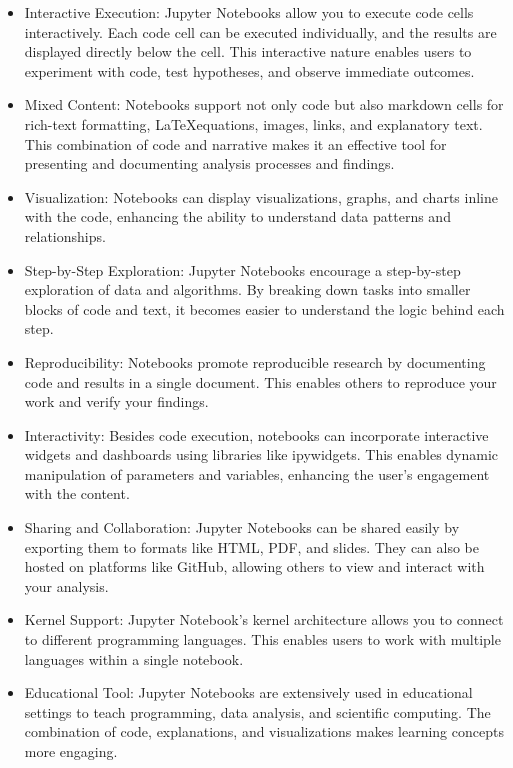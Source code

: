 \begin{itemize}
    \item Interactive Execution: Jupyter Notebooks allow you to execute code cells interactively. Each code cell can be executed individually, and the results are displayed directly below the cell. This interactive nature enables users to experiment with code, test hypotheses, and observe immediate outcomes.
    
    \item Mixed Content: Notebooks support not only code but also markdown cells for rich-text formatting, \LaTeX equations, images, links, and explanatory text. This combination of code and narrative makes it an effective tool for presenting and documenting analysis processes and findings.
    
    \item Visualization: Notebooks can display visualizations, graphs, and charts inline with the code, enhancing the ability to understand data patterns and relationships.
    
    \item Step-by-Step Exploration: Jupyter Notebooks encourage a step-by-step exploration of data and algorithms. By breaking down tasks into smaller blocks of code and text, it becomes easier to understand the logic behind each step.
    
    \item Reproducibility: Notebooks promote reproducible research by documenting code and results in a single document. This enables others to reproduce your work and verify your findings.
    
    \item Interactivity: Besides code execution, notebooks can incorporate interactive widgets and dashboards using libraries like ipywidgets. This enables dynamic manipulation of parameters and variables, enhancing the user's engagement with the content.
    
    \item Sharing and Collaboration: Jupyter Notebooks can be shared easily by exporting them to formats like HTML, PDF, and slides. They can also be hosted on platforms like GitHub, allowing others to view and interact with your analysis.
    
    \item Kernel Support: Jupyter Notebook's kernel architecture allows you to connect to different programming languages. This enables users to work with multiple languages within a single notebook.
    
    \item Educational Tool: Jupyter Notebooks are extensively used in educational settings to teach programming, data analysis, and scientific computing. The combination of code, explanations, and visualizations makes learning concepts more engaging.
\end{itemize}

